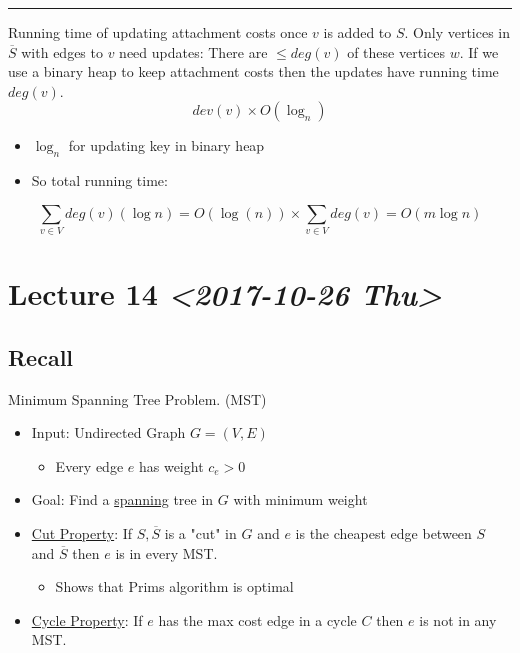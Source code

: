 \documentclass[11pt]{article}
\begin{document}
\noindent\rule{\textwidth}{0.5pt}
Running time of updating attachment costs once \(v\) is added to \(S\). Only vertices in \(\overline{S}\) with edges to \(v\) need updates: There are \(\leq deg(v)\) of these vertices \(w\). If we use a binary heap to keep attachment costs then the updates have running time \(deg(v)\).
$$ dev(v) \times O(\log_n)$$
\begin{itemize}
\item \(\log_n\) for updating key in binary heap
\item So total running time:
\end{itemize}
$$ \sum_{v \in V}deg(v)(\log n) = O(\log (n))\times \sum_{v \in V} deg(v) = O(m \log n)$$
\section{Lecture 14 \textit{<2017-10-26 Thu>}}
\label{sec:org998a7b2}
\subsection{Recall}
\label{sec:orgfba8e40}
Minimum Spanning Tree Problem. (MST)
\begin{itemize}
\item Input: Undirected Graph \(G=(V,E)\)
\begin{itemize}
\item Every edge \uline{\(e\)} has weight \(c_e > 0\)
\end{itemize}
\item Goal: Find a \uline{spanning} tree in \(G\) with minimum weight
\item \uline{Cut Property}: If \(S,\overline{S}\) is a "cut" in \(G\) and \uline{\(e\)} is the cheapest edge between \(S\) and \(\overline{S}\) then \uline{\(e\)} is in every MST.
\begin{itemize}
\item Shows that Prims algorithm is optimal
\end{itemize}
\item \uline{Cycle Property}: If \(e\) has the max cost edge in a cycle \(C\) then \(e\) is not in any MST.
\end{itemize}
\end{document}
